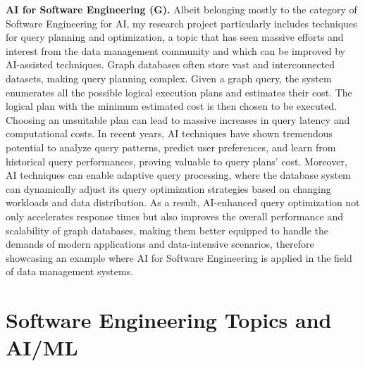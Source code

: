 \documentclass[a4paper, 11pt]{article}
\begin{document}
\noindent\textbf{AI for Software Engineering (G).}
Albeit belonging mostly to the category of Software Engineering for AI, my research project particularly includes techniques for query planning and optimization, a topic that has seen massive efforts and interest from the data management community and which can be improved by AI-assisted techniques. Graph databases often store vast and interconnected datasets, making query planning complex. Given a graph query, the system enumerates all the possible logical execution plans and estimates their cost. The logical plan with the minimum estimated cost is then chosen to be executed. Choosing an unsuitable plan can lead to massive increases in query latency and computational costs.  
In recent years, AI techniques have shown tremendous potential to analyze query patterns, predict user preferences, and learn from historical query performances, proving valuable to query plans' cost. Moreover, AI techniques can enable adaptive query processing, where the database system can dynamically adjust its query optimization strategies based on changing workloads and data distribution. As a result, AI-enhanced query optimization not only accelerates response times but also improves the overall performance and scalability of graph databases, making them better equipped to handle the demands of modern applications and data-intensive scenarios, therefore showcasing an example where AI for Software Engineering is applied in the field of data management systems.


\section{Software Engineering Topics and AI/ML}

\end{document}
